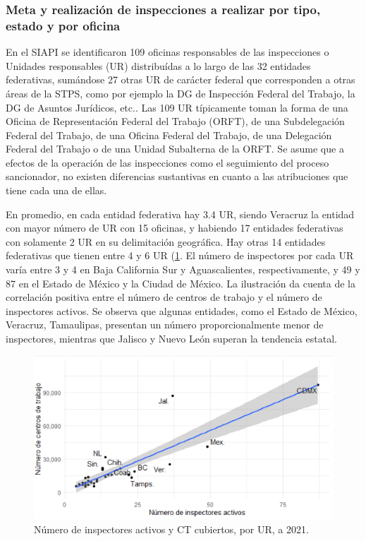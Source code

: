 \documentclass[
]{article}
\begin{document}
\hypertarget{meta-y-realizaciuxf3n-de-inspecciones-a-realizar-por-tipo-estado-y-por-oficina}{%
\subsubsection{Meta y realización de inspecciones a realizar por tipo, estado y por oficina}\label{meta-y-realizaciuxf3n-de-inspecciones-a-realizar-por-tipo-estado-y-por-oficina}}

En el SIAPI se identificaron 109 oficinas responsables de las inspecciones o Unidades responsables (UR) distribuídas a lo largo de las 32 entidades federativas, sumándose 27 otras UR de carácter federal que corresponden a otras áreas de la STPS, como por ejemplo la DG de Inspección Federal del Trabajo, la DG de Asuntos Jurídicos, etc.. Las 109 UR típicamente toman la forma de una Oficina de Representación Federal del Trabajo (ORFT), de una Subdelegación Federal del Trabajo, de una Oficina Federal del Trabajo, de una Delegación Federal del Trabajo o de una Unidad Subalterna de la ORFT. Se asume que a efectos de la operación de las inspecciones como el seguimiento del proceso sancionador, no existen diferencias sustantivas en cuanto a las atribuciones que tiene cada una de ellas.

En promedio, en cada entidad federativa hay 3.4 UR, siendo Veracruz la entidad con mayor número de UR con 15 oficinas, y habiendo 17 entidades federativas con solamente 2 UR en su delimitación geográfica. Hay otras 14 entidades federativas que tienen entre 4 y 6 UR (\ref{fig:InspectoresUR}. El número de inspectores por cada UR varía entre 3 y 4 en Baja California Sur y Aguascalientes, respectivamente, y 49 y 87 en el Estado de México y la Ciudad de México. La ilustración da cuenta de la correlación positiva entre el número de centros de trabajo y el número de inspectores activos. Se observa que algunas entidades, como el Estado de México, Veracruz, Tamaulipas, presentan un número proporcionalmente menor de inspectores, mientras que Jalisco y Nuevo León superan la tendencia estatal.

\begin{figure}
\includegraphics[width=6.97in]{images-1/08/InspectoresUR} \caption{Número de inspectores activos y CT cubiertos, por UR, a 2021.}\label{fig:InspectoresUR}
\end{figure}
\end{document}
